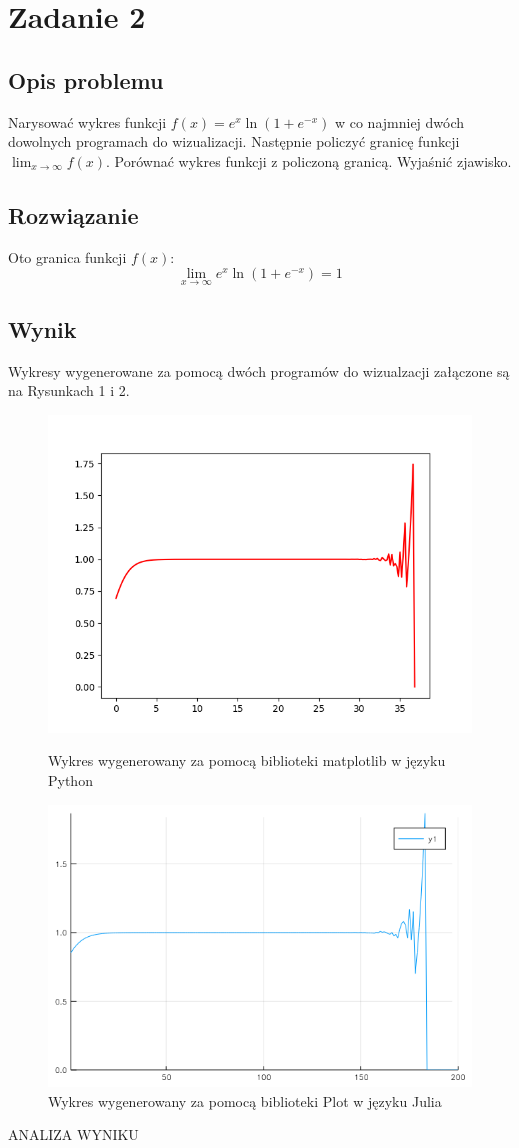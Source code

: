 
\section{Zadanie 2}
\subsection{Opis problemu}
Narysować wykres funkcji $ f(x) = e^x \ln (1 + e^{-x}) $ w co najmniej dwóch dowolnych programach do wizualizacji. Następnie policzyć granicę funkcji $ \lim_{x \to \infty} f(x) $. Porównać
wykres funkcji z policzoną granicą. Wyjaśnić zjawisko.
\subsection{Rozwiązanie}
Oto granica funkcji $ f(x) $:
$$ \lim_{x \to \infty} e^x \ln (1 + e^{-x}) = 1$$
\subsection{Wynik}
Wykresy wygenerowane za pomocą dwóch programów do wizualzacji załączone są na Rysunkach 1 i 2.
\begin{figure}[!htbp]
  \centering  
  \includegraphics[totalheight=7cm]{../source/task-2/matplotlib.png}
  \caption{Wykres wygenerowany za pomocą biblioteki matplotlib w języku Python}
  \includegraphics[totalheight=6cm]{../source/task-2/juliaplot.png}
  \caption{Wykres wygenerowany za pomocą biblioteki Plot w języku Julia}
\end{figure}

ANALIZA WYNIKU
